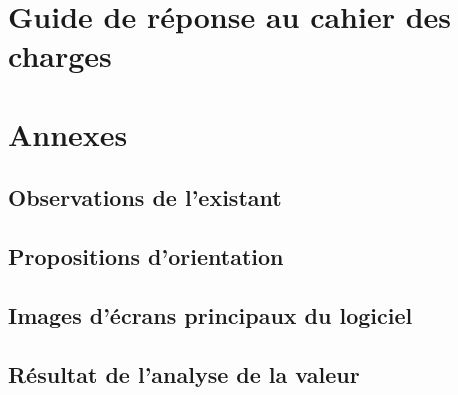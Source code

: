 \section{Guide de réponse au cahier des charges}


\section{Annexes}
\subsection{Observations de l'existant}
\subsection{Propositions d'orientation}
\subsection{Images d'écrans principaux du logiciel}
\subsection{Résultat de l'analyse de la valeur}
